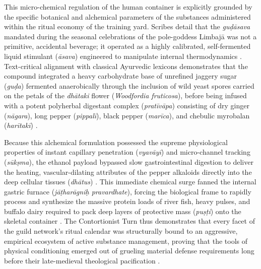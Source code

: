\documentclass[11pt,twoside,letterpaper]{article}
\begin{document}
This micro-chemical regulation of the human container is explicitly grounded by the specific botanical and alchemical parameters of the substances administered within the ritual economy of the training yard. Scribes detail that the \textit{guḍāsava} mandated during the seasonal celebrations of the pole-goddess Limbajā was not a primitive, accidental beverage; it operated as a highly calibrated, self-fermented liquid stimulant (\textit{āsava}) engineered to manipulate internal thermodynamics \citep{Sandesara1948}. Text-critical alignment with classical Ayurvedic lexicons demonstrates that the compound integrated a heavy carbohydrate base of unrefined jaggery sugar (\textit{guḍa}) fermented anaerobically through the inclusion of wild yeast spores carried on the petals of the \textit{dhātaki} flower (\textit{Woodfordia fruticosa}), before being infused with a potent polyherbal digestant complex (\textit{pratīvāpa}) consisting of dry ginger (\textit{nāgara}), long pepper (\textit{pippalī}), black pepper (\textit{marīca}), and chebulic myrobalan (\textit{harītakī}) \citep{MP_7, Sandesara1948}. 

Because this alchemical formulation possessed the supreme physiological properties of instant capillary penetration (\textit{vyavāyī}) and micro-channel tracking (\textit{sūkṣma}), the ethanol payload bypassed slow gastrointestinal digestion to deliver the heating, vascular-dilating attributes of the pepper alkaloids directly into the deep cellular tissues (\textit{dhātus}) \citep{Wujastyk2025}. This immediate chemical surge fanned the internal gastric furnace (\textit{jāṭharāgniḥ pravardhate}), forcing the biological frame to rapidly process and synthesize the massive protein loads of river fish, heavy pulses, and buffalo dairy required to pack deep layers of protective mass (\textit{puṣṭi}) onto the skeletal container \citep{MP_7}. The Contortionist Turn thus demonstrates that every facet of the guild network's ritual calendar was structurally bound to an aggressive, empirical ecosystem of active substance management, proving that the tools of physical conditioning emerged out of grueling material defense requirements long before their late-medieval theological pacification \citep{MP_7, Sandesara1948, Wujastyk2025}.
\end{document}
